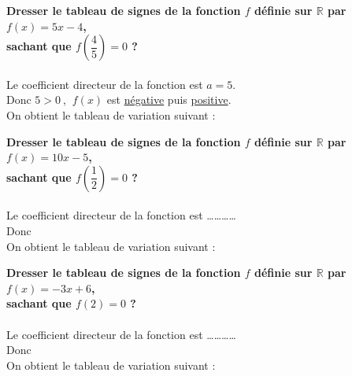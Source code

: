 \documentclass[11pt]{article}
\begin{document}
\begin{exercice}
\textbf{Dresser le tableau de signes de la fonction $f$ définie sur  $\mathbb
R$ par $f(x)=5x-4$, \\ sachant que $f(\dfrac{4}{5})=0$ ?} \\ \\
Le coefficient directeur de la fonction est $a=5$. \\
Donc $5>0~$, $~f(x)$ est \underline{négative} puis \underline{positive}. \\
On obtient le tableau de variation suivant :
\begin{center}
\end{center}
\end{exercice}

\begin{exercice}
\textbf{Dresser le tableau de signes de la fonction $f$ définie sur  $\mathbb
R$ par $f(x)=10x-5$, \\ sachant que $f(\dfrac{1}{2})=0$ ?} \\ \\
Le coefficient directeur de la fonction est \ldots\ldots\ldots\ldots \\
Donc \dotfill \\
On obtient le tableau de variation suivant :
\begin{center}
\end{center}
\end{exercice}

\begin{exercice}
\textbf{Dresser le tableau de signes de la fonction $f$ définie sur  $\mathbb
R$ par $f(x)=-3x+6$, \\ sachant que $f(2)=0$ ?} \\ \\
Le coefficient directeur de la fonction est \ldots\ldots\ldots\ldots \\
Donc \dotfill \\
On obtient le tableau de variation suivant :
\begin{center}
\end{center}
\end{exercice}
\end{document}
